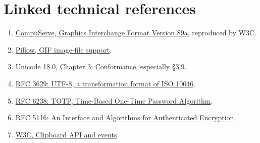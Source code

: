 \documentclass[
  11pt,
  a4paper,
]{article}
\providecommand{\tightlist}{%
  \setlength{\itemsep}{0pt}\setlength{\parskip}{0pt}}
\begin{document}
\hypertarget{linked-technical-references}{%
\section{Linked technical
references}\label{linked-technical-references}}

\begin{enumerate}
\def\labelenumi{\arabic{enumi}.}
\tightlist
\item
  \href{https://www.w3.org/Graphics/GIF/spec-gif89a.txt}{CompuServe,
  Graphics Interchange Format Version 89a}, reproduced by W3C.
\item
  \href{https://pillow.readthedocs.io/en/stable/handbook/image-file-formats.html\#gif}{Pillow,
  GIF image-file support}.
\item
  \href{https://www.unicode.org/versions/Unicode18.0.0/core-spec/chapter-3/}{Unicode
  18.0, Chapter 3: Conformance, especially §3.9}.
\item
  \href{https://www.rfc-editor.org/rfc/rfc3629.html}{RFC 3629: UTF-8, a
  transformation format of ISO 10646}.
\item
  \href{https://www.rfc-editor.org/rfc/rfc6238.html}{RFC 6238: TOTP,
  Time-Based One-Time Password Algorithm}.
\item
  \href{https://www.rfc-editor.org/rfc/rfc5116.html}{RFC 5116: An
  Interface and Algorithms for Authenticated Encryption}.
\item
  \href{https://www.w3.org/TR/clipboard-apis/}{W3C, Clipboard API and
  events}.
\end{enumerate}
\end{document}
